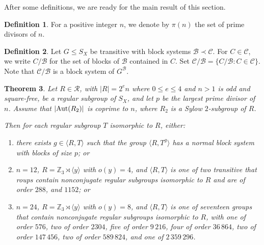 \documentclass[11pt]{amsart}
\numberwithin{equation}{section}
\newtheorem{thrm}{Theorem}[section]
\theoremstyle{definition}
\newtheorem{defin}[thrm]{Definition}
\def\Aut{{\rm Aut}}
\def\Z{{\mathbb Z}}
\newcommand{\sg}[1]{\langle{#1}\rangle}
\begin{document}
	After some definitions, we are ready for the main result of this section.
	
	\begin{defin}
		For a positive integer $n$, we denote by $\pi(n)$ the set of prime divisors of $n$.
	\end{defin}
	
	\begin{defin}
		Let $G \le S_X$ be transitive with block systems ${\mathcal B} \prec {\mathcal C}$.  
		For $C \in {\mathcal C}$, we write 
		$C/{\mathcal B}$
		for the set of blocks of ${\mathcal B}$ contained in $C$.  
		Set $
		{\mathcal C}/{\mathcal B} = \{ C/{\mathcal B} : C \in {\mathcal C} \}$.
		Note that ${\mathcal C}/{\mathcal B}$ is a block system of $G^{{\mathcal B}}$.
	\end{defin}
	
	\begin{thrm}\label{041021a} Let $R \in \mathcal {R}$, with $|R| = 2^e n$ where $0 \le e \le 4$ and $n > 1$ is odd and square-free, be a regular subgroup of $S_X$, and let $p$ be the largest prime divisor of $n$.  
		Assume that $|\Aut(R_2)|$ is coprime to $n$, where $R_2$ is a Sylow $2$-subgroup of $R$.
		
		Then for each regular subgroup $T$ isomorphic to $R$, either: 
		\begin{enumerate}
			\item\label{pabblo1} there exists $g\in\sg{R,T}$ such that the group $\sg{R,T^g}$ has a normal block system with blocks of size $p$; or
			\item\label{pabblo2} $n=12$, $R = \Z_3\rtimes\sg{y}$ with $o(y)=4$, and $\sg{R,T}$ is one of two transitive that roups contain nonconjugate regular subgroups isomorphic to $R$ and are of order $288$, and $1152$; or 
			\item\label{pabblo3} $n=24$, $R = \Z_3\rtimes\sg{y}$ with $o(y)=8$, and $\sg{R,T}$ is one of seventeen groups that contain nonconjugate regular subgroups isomorphic to $R$, with one of order $576$, two of order $2304$, five of order $9\,216$, four of order $36\,864$, two of order $147\,456$, two of order $589\,824$, and one of $2\,359\,296$.
		\end{enumerate} 
	\end{thrm}
	
\end{document}
